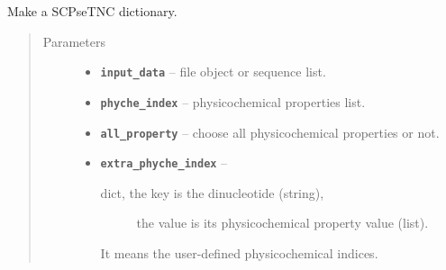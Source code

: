 \documentclass[letterpaper,10pt,english]{sphinxmanual}
\begin{document}
\begin{fulllineitems}
\label{reference/PyDNApsenac:PyDNApsenac.GetSCPseTNC}
Make a SCPseTNC dictionary.
\begin{quote}\begin{description}
\item[{Parameters}] \leavevmode\begin{itemize}
\item {} 
\textbf{\texttt{input\_data}} -- file object or sequence list.

\item {} 
\textbf{\texttt{phyche\_index}} -- physicochemical properties list.

\item {} 
\textbf{\texttt{all\_property}} -- choose all physicochemical properties or not.

\item {} 
\textbf{\texttt{extra\_phyche\_index}} -- \begin{description}
\item[{dict, the key is the dinucleotide (string),}] \leavevmode
the value is its physicochemical property value (list).

\end{description}

It means the user-defined physicochemical indices.


\end{itemize}

\end{description}\end{quote}

\end{fulllineitems}

\end{document}
